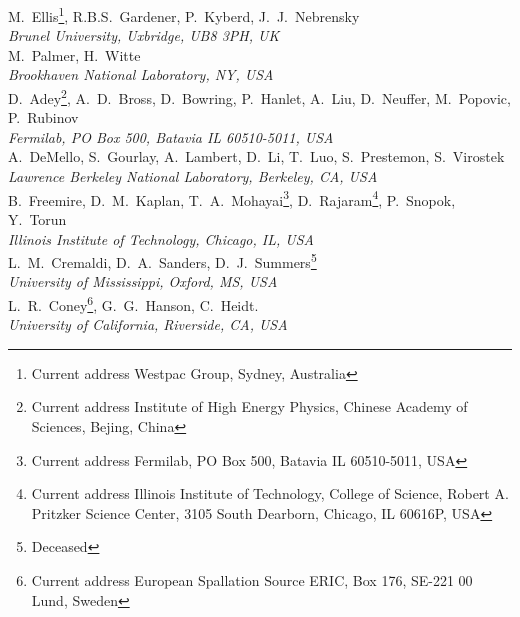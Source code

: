 M.~Ellis\footnote{Current address Westpac Group, Sydney, Australia}, R.B.S.~Gardener, P.~Kyberd, J.~J.~Nebrensky
\\{\it
Brunel University, Uxbridge, UB8 3PH, UK
}\\

M.~Palmer, H.~Witte
\\{\it
Brookhaven National Laboratory, NY, USA
}\\

D.~Adey\footnote{Current address Institute of High Energy Physics, Chinese Academy of Sciences, Bejing, China}, A.~D.~Bross, D.~Bowring, P.~Hanlet, A.~Liu\footnotemark{}\setcounter{FNEuclid}{\value{footnote}}, D.~Neuffer, M.~Popovic, P.~Rubinov
\\{\it
Fermilab, PO Box 500, Batavia IL 60510-5011, USA
}\\

A.~DeMello, S.~Gourlay, A.~Lambert, D.~Li, T.~Luo, S.~Prestemon,  S.~Virostek
\\{\it
Lawrence Berkeley National Laboratory, Berkeley, CA, USA
}\\

B.~Freemire\footnotemark[\value{FNEuclid}], D.~M.~Kaplan, T.~A.~Mohayai\footnote{Current address Fermilab, PO Box 500, Batavia IL 60510-5011, USA}, D.~Rajaram\footnote{Current address Illinois Institute of Technology, College of Science, Robert A. Pritzker Science Center, 3105 South Dearborn, Chicago, IL 60616P, USA}, P.~Snopok, Y.~Torun
\\{\it
Illinois Institute of Technology, Chicago, IL, USA
}\\

L.~M.~Cremaldi, D.~A.~Sanders, D.~J.~Summers\footnote{Deceased}
\\{\it
University of Mississippi, Oxford, MS, USA
}\\

L.~R.~Coney\footnote{Current address European Spallation Source ERIC, Box 176, SE-221 00 Lund, Sweden}, G.~G.~Hanson, C.~Heidt.
\\{\it
University of California, Riverside, CA, USA
}\\
